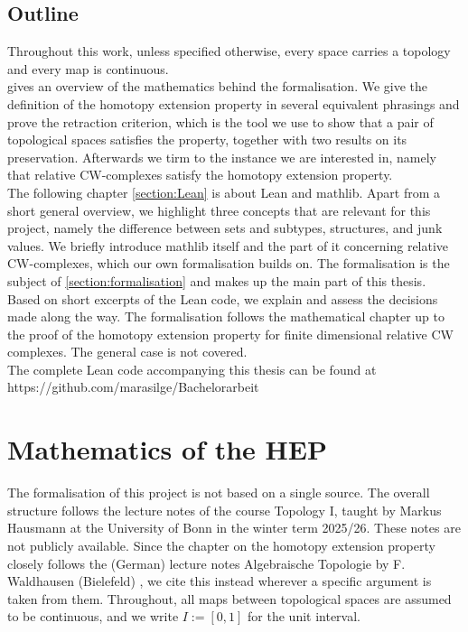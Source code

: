 \documentclass[11pt, a4paper, english]{article}
\theoremstyle{plain}
\theoremstyle{definition}
\theoremstyle{remark}
\numberwithin{equation}{section}
\numberwithin{theorem}{section}
\begin{document}
\subsection*{Outline}
Throughout this work, unless specified otherwise, every space carries a topology and every map is continuous. \\
 gives an overview of the mathematics behind the formalisation. We give the definition of the homotopy extension property in several equivalent phrasings and prove the retraction criterion, which is the tool we use to show that a pair of topological spaces satisfies the property, together with two results on its preservation. Afterwards we tirm to the instance we are interested in, namely that relative CW-complexes satisfy the homotopy extension property. \\
The following chapter \cref{section:Lean} is about Lean and mathlib. Apart from  a short general overview, we highlight three concepts that are relevant for this project, namely the difference between sets and subtypes, structures, and junk values. We briefly introduce mathlib itself and the part of it concerning relative CW-complexes, which our own formalisation builds on. The formalisation is the subject of \cref{section:formalisation} and makes up the main part of this thesis.\\
Based on short excerpts of the Lean code, we explain and assess the decisions made along the way. The formalisation follows the mathematical chapter up to the proof of the homotopy extension property for finite dimensional relative CW complexes. The general case is not covered. \\
The complete Lean code accompanying this thesis can be found at https://github.com/marasilge/Bachelorarbeit


\newpage 
\section {Mathematics of the HEP} \label{section:math}
The formalisation of this project is not based on a single source. The overall structure follows the lecture notes of the course Topology I, taught by Markus Hausmann at the University of Bonn in the winter term 2025/26. These notes are not publicly available. Since the chapter on the homotopy extension property closely follows the (German) lecture notes Algebraische Topologie by F. Waldhausen (Bielefeld) \cite{WAL}, we cite this instead wherever a specific argument is taken from them.
Throughout, all maps between topological spaces are assumed to be continuous, and we write $I :=[0,1]$ for the unit interval. %
\end{document}
